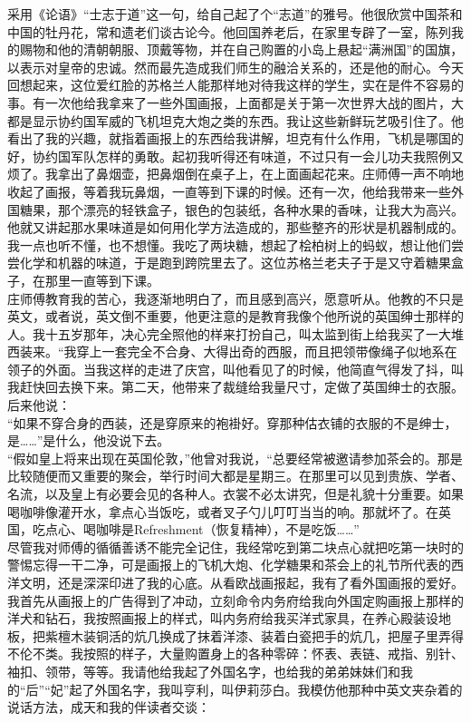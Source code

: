 采用《论语》“士志于道”这一句，给自己起了个“志道”的雅号。他很欣赏中国茶和中国的牡丹花，常和遗老们谈古论今。他回国养老后，在家里专辟了一室，陈列我的赐物和他的清朝朝服、顶戴等物，并在自己购置的小岛上悬起“满洲国”的国旗，以表示对皇帝的忠诚。然而最先造成我们师生的融洽关系的，还是他的耐心。今天回想起来，这位爱红脸的苏格兰人能那样地对待我这样的学生，实在是件不容易的事。有一次他给我拿来了一些外国画报，上面都是关于第一次世界大战的图片，大都是显示协约国军威的飞机坦克大炮之类的东西。我让这些新鲜玩艺吸引住了。他看出了我的兴趣，就指着画报上的东西给我讲解，坦克有什么作用，飞机是哪国的好，协约国军队怎样的勇敢。起初我听得还有味道，不过只有一会儿功夫我照例又烦了。我拿出了鼻烟壶，把鼻烟倒在桌子上，在上面画起花来。庄师傅一声不响地收起了画报，等着我玩鼻烟，一直等到下课的时候。还有一次，他给我带来一些外国糖果，那个漂亮的轻铁盒子，银色的包装纸，各种水果的香味，让我大为高兴。他就又讲起那水果味道是如何用化学方法造成的，那些整齐的形状是机器制成的。我一点也听不懂，也不想懂。我吃了两块糖，想起了桧柏树上的蚂蚁，想让他们尝尝化学和机器的味道，于是跑到跨院里去了。这位苏格兰老夫子于是又守着糖果盒子，在那里一直等到下课。\\

庄师傅教育我的苦心，我逐渐地明白了，而且感到高兴，愿意听从。他教的不只是英文，或者说，英文倒不重要，他更注意的是教育我像个他所说的英国绅士那样的人。我十五岁那年，决心完全照他的样来打扮自己，叫太监到街上给我买了一大堆西装来。“我穿上一套完全不合身、大得出奇的西服，而且把领带像绳子似地系在领子的外面。当我这样的走进了庆宫，叫他看见了的时候，他简直气得发了抖，叫我赶快回去换下来。第二天，他带来了裁缝给我量尺寸，定做了英国绅士的衣服。后来他说：\\

“如果不穿合身的西装，还是穿原来的袍褂好。穿那种估衣铺的衣服的不是绅士，是……”是什么，他没说下去。\\

“假如皇上将来出现在英国伦敦，”他曾对我说，“总要经常被邀请参加茶会的。那是比较随便而又重要的聚会，举行时间大都是星期三。在那里可以见到贵族、学者、名流，以及皇上有必要会见的各种人。衣裳不必太讲究，但是礼貌十分重要。如果喝咖啡像灌开水，拿点心当饭吃，或者叉子勺儿叮叮当当的响。那就坏了。在英国，吃点心、喝咖啡是Refreshment（恢复精神），不是吃饭……”\\

尽管我对师傅的循循善诱不能完全记住，我经常吃到第二块点心就把吃第一块时的警惕忘得一干二净，可是画报上的飞机大炮、化学糖果和茶会上的礼节所代表的西洋文明，还是深深印进了我的心底。从看欧战画报起，我有了看外国画报的爱好。我首先从画报上的广告得到了冲动，立刻命令内务府给我向外国定购画报上那样的洋犬和钻石，我按照画报上的样式，叫内务府给我买洋式家具，在养心殿装设地板，把紫檀木装铜活的炕几换成了抹着洋漆、装着白瓷把手的炕几，把屋子里弄得不伦不类。我按照的样子，大量购置身上的各种零碎：怀表、表链、戒指、别针、袖扣、领带，等等。我请他给我起了外国名字，也给我的弟弟妹妹们和我的“后”“妃”起了外国名字，我叫亨利，叫伊莉莎白。我模仿他那种中英文夹杂着的说话方法，成天和我的伴读者交谈：\\


